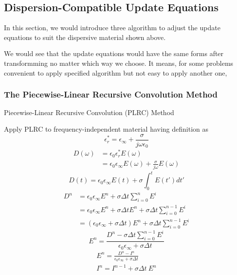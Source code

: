 \subsection{Dispersion-Compatible Update Equations}
In this section, we would introduce three algorithm to adjust the update equations to suit the dispersive material shown
above.

We would see that the update equations would have the same forms after transformming no matter which way we choose. It
means, for some problems convenient to apply specified algorithm but not easy to apply another one, 

\subsubsection{The Piecewise-Linear Recursive Convolution Method}
Piecewise-Linear Recursive Convolution (PLRC) Method

Apply PLRC to frequency-independent material having definition as
\begin{displaymath}
  \epsilon_r^{*} = \epsilon_{\infty} + \frac{\sigma}{j \omega \epsilon_0}
\end{displaymath}
\begin{displaymath}
  \begin{split}
    D(\omega) & = \epsilon_0 \epsilon_r^{*} E(\omega)\\
    & = \epsilon_0 \epsilon_{\infty} E(\omega) + \frac{\sigma}{j\omega}E(\omega)
  \end{split}
\end{displaymath}
\begin{displaymath}
  D(t) = \epsilon_0 \epsilon_{\infty}E(t) + \sigma \int_0^t E(t')dt'
\end{displaymath}
\begin{displaymath}
  \begin{split}
    D^n & = \epsilon_0 \epsilon_{\infty} E^n + \sigma \Delta t \sum_{i=0}^{n}E^i\\
    & = \epsilon_0 \epsilon_{\infty} E^n + \sigma \Delta t E^n + \sigma \Delta t \sum_{i=0}^{n-1}E^i\\
    & = (\epsilon_0 \epsilon_{\infty} + \sigma \Delta t) E^n + \sigma \Delta t \sum_{i=0}^{n-1}E^i
  \end{split}
\end{displaymath}
\begin{displaymath}
  E^n = \frac{\displaystyle D^n - \sigma \Delta t \sum_{i=0}^{n-1}E^i}{\epsilon_0 \epsilon_{\infty} + \sigma \Delta t}
\end{displaymath}
\begin{gather*}
  E^n = \frac{D^n - I^n}{\epsilon_0 \epsilon_{\infty} + \sigma \Delta t}\\
  I^n = I^{n-1} + \sigma \Delta t\ E^n
\end{gather*}


